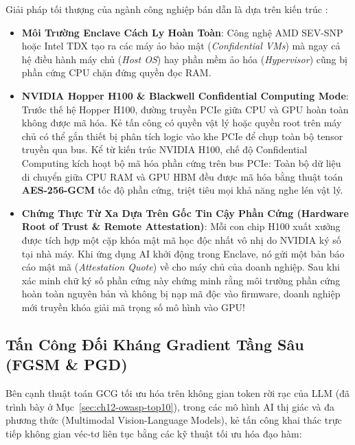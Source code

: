Giải pháp tối thượng của ngành công nghiệp bán dẫn là  dựa trên kiến trúc :
\begin{itemize}
  \item \textbf{Môi Trường Enclave Cách Ly Hoàn Toàn}: Công nghệ AMD SEV-SNP hoặc Intel TDX tạo ra các máy ảo bảo mật (\textit{Confidential VMs}) mà ngay cả hệ điều hành máy chủ (\textit{Host OS}) hay phần mềm ảo hóa (\textit{Hypervisor}) cũng bị phần cứng CPU chặn đứng quyền đọc RAM.
  \item \textbf{NVIDIA Hopper H100 \& Blackwell Confidential Computing Mode}:
  Trước thế hệ Hopper H100, đường truyền PCIe giữa CPU và GPU hoàn toàn không được mã hóa. Kẻ tấn công có quyền vật lý hoặc quyền root trên máy chủ có thể gắn thiết bị phân tích logic vào khe PCIe để chụp toàn bộ tensor truyền qua bus.
  Kể từ kiến trúc NVIDIA H100, chế độ Confidential Computing kích hoạt bộ mã hóa phần cứng trên bus PCIe: Toàn bộ dữ liệu di chuyển giữa CPU RAM và GPU HBM đều được mã hóa bằng thuật toán \textbf{AES-256-GCM} tốc độ phần cứng, triệt tiêu mọi khả năng nghe lén vật lý.
  \item \textbf{Chứng Thực Từ Xa Dựa Trên Gốc Tin Cậy Phần Cứng (Hardware Root of Trust \& Remote Attestation)}:
  Mỗi con chip H100 xuất xưởng được tích hợp một cặp khóa mật mã học độc nhất vô nhị do NVIDIA ký số tại nhà máy. Khi ứng dụng AI khởi động trong Enclave, nó gửi một bản báo cáo mật mã (\textit{Attestation Quote}) về cho máy chủ của doanh nghiệp. Sau khi xác minh chữ ký số phần cứng này chứng minh rằng môi trường phần cứng hoàn toàn nguyên bản và không bị nạp mã độc vào firmware, doanh nghiệp mới truyền khóa giải mã trọng số mô hình vào GPU!
\end{itemize}

\subsection{Tấn Công Đối Kháng Gradient Tầng Sâu (FGSM \& PGD)}
\label{subsec:adversarial-gradient-attacks}
Bên cạnh thuật toán GCG tối ưu hóa trên không gian token rời rạc của LLM (đã trình bày ở Mục~\ref{sec:ch12-owasp-top10}), trong các mô hình AI thị giác và đa phương thức (Multimodal Vision-Language Models), kẻ tấn công khai thác trực tiếp không gian véc-tơ liên tục bằng các kỹ thuật tối ưu hóa đạo hàm:

